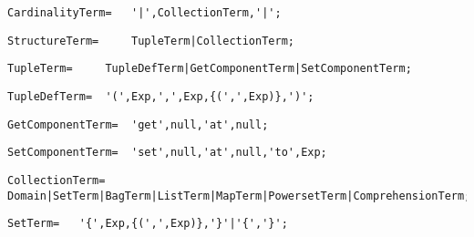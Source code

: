 \documentclass{article}
\begin{document}
    \begin{flushleft}
    \begin{lstlisting}[mathescape=true, breaklines=true]
     CardinalityTerm= 	'|',CollectionTerm,'|';
    \end{lstlisting}
    \end{flushleft}
    \begin{flushleft}
    \begin{lstlisting}[mathescape=true, breaklines=true]
     StructureTerm= 	TupleTerm|CollectionTerm;
    \end{lstlisting}
    \end{flushleft}
    \begin{flushleft}
    \begin{lstlisting}[mathescape=true, breaklines=true]
     TupleTerm= 	TupleDefTerm|GetComponentTerm|SetComponentTerm;
    \end{lstlisting}
    \end{flushleft}
    \begin{flushleft}
    \begin{lstlisting}[mathescape=true, breaklines=true]
     TupleDefTerm= 	'(',Exp,',',Exp,{(',',Exp)},')';
    \end{lstlisting}
    \end{flushleft}
    \begin{flushleft}
    \begin{lstlisting}[mathescape=true, breaklines=true]
     GetComponentTerm= 	'get',null,'at',null;
    \end{lstlisting}
    \end{flushleft}
    \begin{flushleft}
    \begin{lstlisting}[mathescape=true, breaklines=true]
     SetComponentTerm= 	'set',null,'at',null,'to',Exp;
    \end{lstlisting}
    \end{flushleft}
    \begin{flushleft}
    \begin{lstlisting}[mathescape=true, breaklines=true]
     CollectionTerm= 	Domain|SetTerm|BagTerm|ListTerm|MapTerm|PowersetTerm|ComprehensionTerm;
    \end{lstlisting}
    \end{flushleft}
    \begin{flushleft}
    \begin{lstlisting}[mathescape=true, breaklines=true]
     SetTerm= 	'{',Exp,{(',',Exp)},'}'|'{','}';
    \end{lstlisting}
    \end{flushleft}
\end{document}
